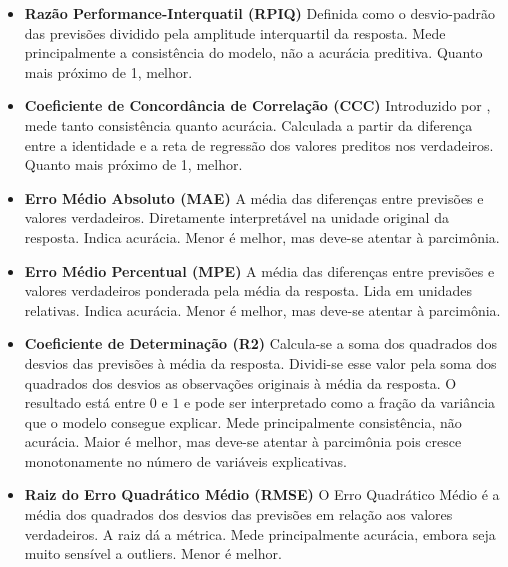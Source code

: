 \begin{itemize}
    \item \textbf{Razão Performance-Interquatil (RPIQ)} \newline
    Definida como o desvio-padrão das previsões dividido pela amplitude interquartil da resposta. Mede principalmente a consistência do modelo, não a acurácia preditiva. Quanto mais próximo de 1, melhor. 
    
    \item \textbf{Coeficiente de Concordância de Correlação (CCC)} \newline
    Introduzido por , mede tanto consistência quanto acurácia. Calculada a partir da diferença entre a identidade e a reta de regressão dos valores preditos nos verdadeiros. Quanto mais próximo de 1, melhor.
    
    \item \textbf{Erro Médio Absoluto (MAE)} \newline
    A média das diferenças entre previsões e valores verdadeiros. Diretamente interpretável na unidade original da resposta. Indica acurácia. Menor é melhor, mas deve-se atentar à parcimônia.
    
    \item \textbf{Erro Médio Percentual (MPE)} \newline
    A média das diferenças entre previsões e valores verdadeiros ponderada pela média da resposta. Lida em unidades relativas. Indica acurácia. Menor é melhor, mas deve-se atentar à parcimônia.
    
    \item \textbf{Coeficiente de Determinação (R2)} \newline
    Calcula-se a soma dos quadrados dos desvios das previsões à média da resposta. Dividi-se esse valor pela soma dos quadrados dos desvios as observações originais à média da resposta. O resultado está entre $0$ e $1$ e pode ser interpretado como a fração da variância que o modelo consegue explicar. Mede principalmente consistência, não acurácia. Maior é melhor, mas deve-se atentar à parcimônia pois cresce monotonamente no número de variáveis explicativas.
    
    \item \textbf{Raiz do Erro Quadrático Médio (RMSE)} \newline
    O Erro Quadrático Médio é a média dos quadrados dos desvios das previsões em relação aos valores verdadeiros. A raiz dá a métrica. Mede principalmente acurácia, embora seja muito sensível a outliers. Menor é melhor.
    
\end{itemize}

